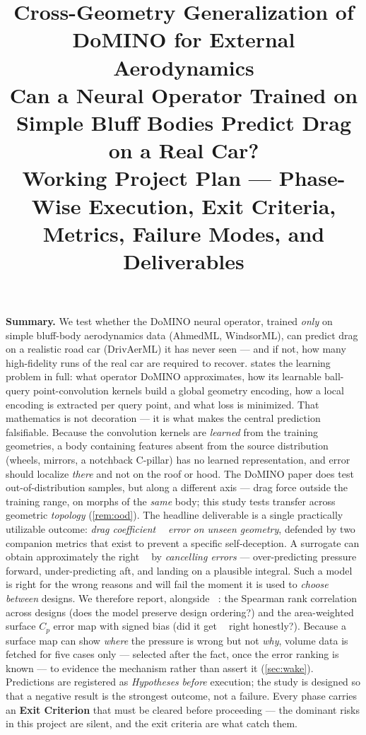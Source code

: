 \documentclass[10pt,a4paper]{article}
\title{\vspace{-1.5em}\large\bfseries
Cross-Geometry Generalization of DoMINO for External Aerodynamics\\
\normalsize Can a Neural Operator Trained on Simple Bluff Bodies Predict
Drag on a Real Car?\\[0.3em]
\small\mdseries Working Project Plan --- Phase-Wise Execution, Exit Criteria,
Metrics, Failure Modes, and Deliverables}
\author{}
\date{}
\theoremstyle{definition}
\DeclareMathOperator{\Cd}{C_d}
\newcommand{\Cp}{{C_p}}
\begin{document}
\maketitle
\vspace{-3em}
\thispagestyle{fancy}

{\small
\noindent\textbf{Summary.}
We test whether the DoMINO neural operator, trained \emph{only} on simple
bluff-body aerodynamics data (AhmedML, WindsorML), can predict drag on a
realistic road car (DrivAerML) it has never seen --- and if not, how many
high-fidelity runs of the real car are required to recover.  states
the learning problem in full: what operator DoMINO approximates, how its learnable
ball-query point-convolution kernels build a global geometry encoding, how a local
encoding is extracted per query point, and what loss is minimized. That mathematics is
not decoration --- it is what makes the central prediction falsifiable. Because the
convolution kernels are \emph{learned} from the training geometries, a body containing
features absent from the source distribution (wheels, mirrors, a notchback C-pillar)
has no learned representation, and error should localize \emph{there} and not on the
roof or hood. The DoMINO paper does test out-of-distribution samples, but along a
different axis --- drag force outside the training range, on morphs of the \emph{same}
body; this study tests transfer across geometric \emph{topology}
(\cref{rem:ood}). The headline deliverable is a single practically utilizable outcome:
\emph{drag coefficient $\Cd$ error on unseen geometry}, defended by two companion
metrics that exist to prevent a specific self-deception. A surrogate can obtain
approximately the right $\Cd$ by \emph{cancelling errors} --- over-predicting pressure
forward, under-predicting aft, and landing on a plausible integral. Such a model is
right for the wrong reasons and will fail the moment it is used to \emph{choose
between} designs. We therefore report, alongside $\Cd$: the Spearman rank correlation
across designs (does the model preserve design ordering?) and the area-weighted
surface $\Cp$ error map with signed bias (did it get $\Cd$ right honestly?).
Because a surface map can show \emph{where} the pressure is wrong but not \emph{why},
volume data is fetched for five cases only --- selected after the fact, once the error
ranking is known --- to evidence the mechanism rather than assert it
(\cref{sec:wake}). Predictions are registered as \emph{Hypotheses} \emph{before}
execution; the study is designed so that a negative result is the strongest outcome,
not a failure. Every
phase carries an \textbf{Exit Criterion} that must be cleared before proceeding ---
the dominant risks in this project are silent, and the exit criteria are what catch
them.
}
\vspace{4pt}
\end{document}
